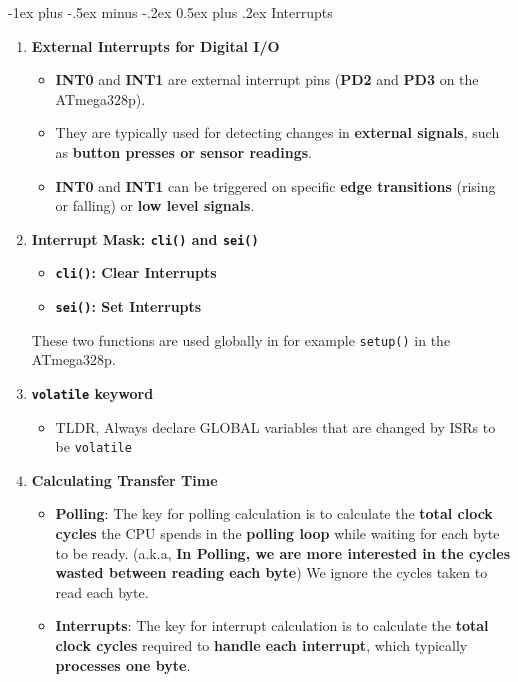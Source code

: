 \documentclass[10pt, landscape]{article}
\makeatletter
\renewcommand{\section}{\@startsection{section}{1}{0mm}%
                                {-1ex plus -.5ex minus -.2ex}%
                                {0.5ex plus .2ex}%
                                {\normalfont\large\bfseries}}
\makeatother
\begin{document}
\begin{multicols}{4}
\section{Interrupts}
\begin{enumerate}
    \item \textbf{External Interrupts for Digital I/O}
    \begin{itemize}
        \item \textbf{INT0} and \textbf{INT1} are external interrupt pins (\textbf{PD2} and \textbf{PD3} on the ATmega328p).
        \item They are typically used for detecting changes\textbf{} in \textbf{external signals}, such as \textbf{button presses or sensor readings}.
        \item \textbf{INT0} and \textbf{INT1} can be triggered on specific \textbf{edge transitions} (rising or falling) or \textbf{low level signals}.
    \end{itemize}
    \item \textbf{Interrupt Mask: \texttt{cli()} and \texttt{sei()}}
    \begin{itemize}
        \item \textbf{\texttt{cli()}: Clear Interrupts}
        \item \textbf{\texttt{sei()}: Set Interrupts}
    \end{itemize}
    These two functions are used globally in for example \texttt{setup()} in the ATmega328p.
    \item \textbf{\texttt{volatile} keyword}
    \begin{itemize}
        \item TLDR, Always declare GLOBAL variables that are changed by ISRs to be \texttt{volatile}
    \end{itemize}
    \item \textbf{Calculating Transfer Time}
    \begin{itemize}
        \item \textbf{Polling}: The key for polling calculation is to calculate the \textbf{total clock cycles} the CPU spends in the \textbf{polling loop} while waiting for each byte to be ready. (a.k.a, \textbf{In Polling, we are more interested in the cycles wasted between reading each byte}) We ignore the cycles taken to read each byte.
        \item \textbf{Interrupts}: The key for interrupt calculation is to calculate the \textbf{total clock cycles} required to \textbf{handle each interrupt}, which typically \textbf{processes one byte}.

\end{itemize}
\end{enumerate}
\end{multicols}
\end{document}
